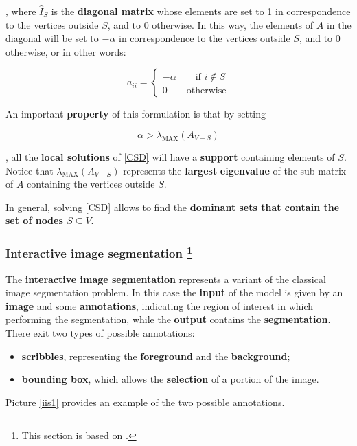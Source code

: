 , where $\hat{I}_S$ is the \textbf{diagonal matrix} whose elements are set to 1 in correspondence to the vertices outside $S$, and to 0 otherwise. In this way, the elements of $A$ in the diagonal will be set to $-\alpha$ in correspondence to the vertices outside $S$, and to 0 otherwise, or in other words:

$$
a_{ii} = \begin{cases}
    - \alpha \qquad \text{if } i \not\in S \\
    0 \qquad \text{otherwise}
\end{cases}
$$

An important \textbf{property} of this formulation is that by setting 

$$
\alpha > \lambda_{\text{MAX}} (A_{V - S})
$$

, all the \textbf{local solutions} of \ref{CSD} will have a \textbf{support} containing elements of $S$. Notice that $\lambda_{\text{MAX}} (A_{V - S})$ represents the \textbf{largest} \textbf{eigenvalue} of the sub-matrix of $A$ containing the vertices outside $S$.

In general, solving \ref{CSD} allows to find the \textbf{dominant sets that contain the set of nodes $S \subseteq V$}.


\subsubsection{Interactive image segmentation \footnote{This section is based on \cite{zemene2018dominant}.}}
The \textbf{interactive image segmentation} represents a variant of the classical image segmentation problem. In this case the \textbf{input} of the model is given by an \textbf{image} and some \textbf{annotations}, indicating the region of interest in which performing the segmentation, while the \textbf{output} contains the \textbf{segmentation}. There exit two types of possible annotations:

\begin{itemize}
    \item \textbf{scribbles}, representing the \textbf{foreground} and the \textbf{background};
    \item \textbf{bounding box}, which allows the \textbf{selection} of a portion of the image.
\end{itemize}

Picture \ref{iis1} provides an example of the two possible annotations.

